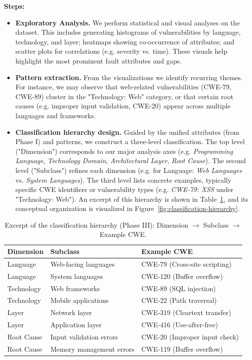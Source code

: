 \textbf{Steps:}
\begin{itemize}
    \item \textbf{Exploratory Analysis.} We perform statistical and visual analyses on the dataset. This includes generating histograms of vulnerabilities by language, technology, and layer; heatmaps showing co-occurrence of attributes; and scatter plots for correlations (e.g. severity vs. time). These visuals help highlight the most prominent fault attributes and gaps.
    \item \textbf{Pattern extraction.} From the visualizations we identify recurring themes. For instance, we may observe that web-related vulnerabilities (CWE-79, CWE-89) cluster in the "Technology: Web" category, or that certain root causes (e.g. improper input validation, CWE-20) appear across multiple languages and frameworks.
    \item \textbf{Classification hierarchy design.} Guided by the unified attributes (from Phase I) and patterns, we construct a three-level classification. The top level ("Dimension") corresponds to our major analysis axes (e.g. {\em Programming Language}, {\em Technology Domain}, {\em Architectural Layer}, {\em Root Cause}). The second level ("Subclass") refines each dimension (e.g. for Language: {\em Web Languages} vs. {\em System Languages}). The third level lists concrete examples, typically specific CWE identifiers or vulnerability types (e.g. {\em CWE-79: XSS} under "Technology: Web"). An excerpt of this hierarchy is shown in Table~\ref{tab:classification}, and its conceptual organization is visualized in Figure~\ref{fig:classification-hierarchy}.
\end{itemize}

\begin{table}[h!]
\centering
\caption{Excerpt of the classification hierarchy (Phase III): Dimension $\rightarrow$ Subclass $\rightarrow$ Example CWE.}
\label{tab:classification}
\begin{tabular}{lll}
\hline
\textbf{Dimension} & \textbf{Subclass} & \textbf{Example CWE} \\
\hline
Language & Web-facing languages & CWE-79 (Cross-site scripting) \\
Language & System languages & CWE-120 (Buffer overflow) \\
Technology & Web frameworks & CWE-89 (SQL injection) \\
Technology & Mobile applications & CWE-22 (Path traversal) \\
Layer & Network layer & CWE-319 (Cleartext transfer) \\
Layer & Application layer & CWE-416 (Use-after-free) \\
Root Cause & Input validation errors & CWE-20 (Improper input check) \\
Root Cause & Memory management errors & CWE-119 (Buffer overflow) \\
\hline
\end{tabular}
\end{table}


